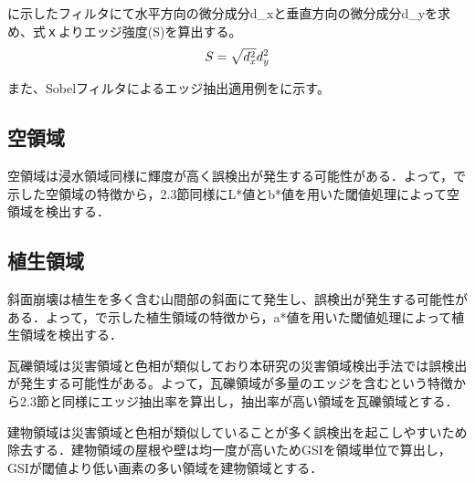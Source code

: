 \documentclass[../Thesis]{subfiles}
\begin{document}
  に示したフィルタにて水平方向の微分成分d_xと垂直方向の微分成分d_yを求め、式ｘよりエッジ強度(S)を算出する。
  \begin{equation}
    S = \sqrt{d_x^2}{d_y^2} \\
  \end{equation}

  また、Sobelフィルタによるエッジ抽出適用例をに示す。
  

\subsection{空領域}
  空領域は浸水領域同様に輝度が高く誤検出が発生する可能性がある．よって，で示した空領域の特徴から，2.3節同様にL*値とb*値を用いた閾値処理によって空領域を検出する．
  
\subsection{植生領域}
  斜面崩壊は植生を多く含む山間部の斜面にて発生し、誤検出が発生する可能性がある．よって，で示した植生領域の特徴から，a*値を用いた閾値処理によって植生領域を検出する．
	
  瓦礫領域は災害領域と色相が類似しており本研究の災害領域検出手法では誤検出が発生する可能性がある。よって，瓦礫領域が多量のエッジを含むという特徴から2.3節と同様にエッジ抽出率を算出し，抽出率が高い領域を瓦礫領域とする．  

  建物領域は災害領域と色相が類似していることが多く誤検出を起こしやすいため除去する．建物領域の屋根や壁は均一度が高いためGSIを領域単位で算出し，GSIが閾値より低い画素の多い領域を建物領域とする．
\end{document}
